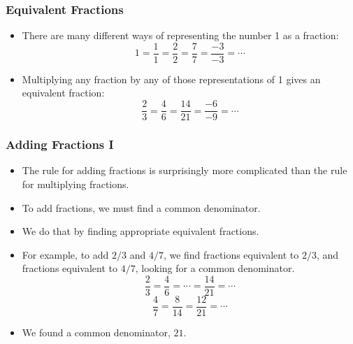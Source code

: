 \documentclass[serif,ignorenonframetext]{beamer}
\begin{document}
\begin{frame}
  \frametitle{Equivalent Fractions}
  \begin{itemize}[<+->]
  \item There are many different ways of representing the number 1 as
    a fraction:
    \begin{equation*}
      1 = \frac{1}{1} = \frac{2}{2} = \frac{7}{7} = \frac{-3}{-3} = \cdots
    \end{equation*}
  \item Multiplying any fraction by any of those representations of 1
    gives an equivalent fraction:
    \begin{equation*}
      \frac{2}{3} = \frac{4}{6} = \frac{14}{21} = \frac{-6}{-9} =
      \cdots
    \end{equation*}
  \end{itemize}
\end{frame}

\begin{frame}
  \frametitle{Adding Fractions I}
  \begin{itemize}[<+->]
  \item The rule for adding fractions is surprisingly more complicated
    than the rule for multiplying fractions.
  \item To add fractions, we must find a common denominator.
  \item We do that by finding appropriate equivalent fractions.
  \item For example, to add $2/3$ and $4/7$, we find fractions
    equivalent to $2/3$, and fractions equivalent to $4/7$, looking
    for a common denominator.
    \begin{equation*}
      \frac{2}{3} = \frac{4}{6} = \cdots = \frac{14}{21} = \cdots
    \end{equation*}
    \begin{equation*}
      \frac{4}{7} = \frac{8}{14} = \frac{12}{21} = \cdots
    \end{equation*}
  \item We found a common denominator, $21$.
  \end{itemize}
\end{frame}
\end{document}
